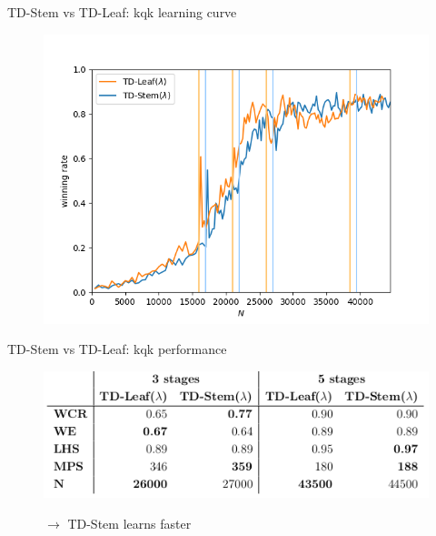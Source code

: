 \documentclass{beamer}
\begin{document}
\begin{frame}{TD-Stem vs TD-Leaf: kqk learning curve}
\begin{figure}
\centering
\includegraphics[scale=0.6]{fig/plots/kqk_lc}
\end{figure}
\end{frame}

\begin{frame}{TD-Stem vs TD-Leaf: kqk performance}
\begin{figure}
\centering
\includegraphics[scale=0.6]{tab2}
\begin{center}
$\rightarrow$ TD-Stem learns faster
\end{center}
\end{figure}
\end{frame}
\end{document}
